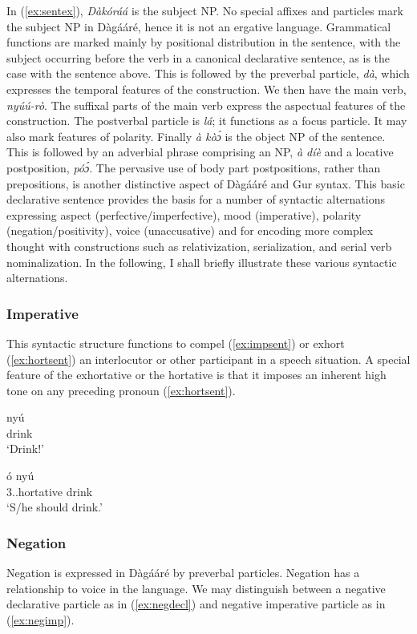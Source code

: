 In (\ref{ex:sentex}), \textit{Dàkóráá} is the subject NP. No special affixes and particles mark the subject NP in
Dàgááré, hence it is not an ergative language. Grammatical functions are marked mainly by
positional distribution in the sentence, with the subject occurring before the verb in a
canonical declarative sentence, as is the case with the sentence above. This is followed by the
preverbal particle, \textit{dà}, which expresses the temporal features of the construction. We then
have the main verb, \textit{nyúú-rò}. The suffixal parts of the main verb express the aspectual
features of the construction. The postverbal particle is \textit{lá}; it functions as a focus particle. It
may also mark features of polarity. Finally \textit{à kòɔ́} is the object NP of the sentence. This is
followed by an adverbial phrase comprising an NP, \textit{à díè} and a locative postposition, \textit{póɔ́}.
The pervasive use of body part postpositions, rather than prepositions, is another distinctive
aspect of Dàgááré and Gur syntax.
This basic declarative sentence provides the basis for a number of syntactic
alternations expressing aspect (perfective/imperfective), mood (imperative), polarity
(negation/positivity), voice (unaccusative) and for encoding more complex thought with constructions such as relativization, serialization, and serial verb nominalization.
In the following, I shall briefly illustrate these various syntactic alternations.

\subsubsection{Imperative}
This syntactic structure functions to compel (\ref{ex:impsent}) or exhort (\ref{ex:hortsent}) an interlocutor or other
participant in a speech situation. A special feature of the exhortative or the hortative is that it
imposes an inherent high tone on any preceding pronoun (\ref{ex:hortsent}).

\ea \label{ex:impsent} \gll nyú\\
drink\\
\glt ‘Drink!’\z

\ea \label{ex:hortsent} \gll ó nyú\\
3.{\SG}.hortative drink\\
\glt ‘S/he should drink.’\z 

\subsubsection{ Negation}
Negation is expressed in Dàgááré by preverbal particles. Negation has a relationship
to voice in the language. We may distinguish between a negative declarative particle as in (\ref{ex:negdecl})
and negative imperative particle as in (\ref{ex:negimp}).

